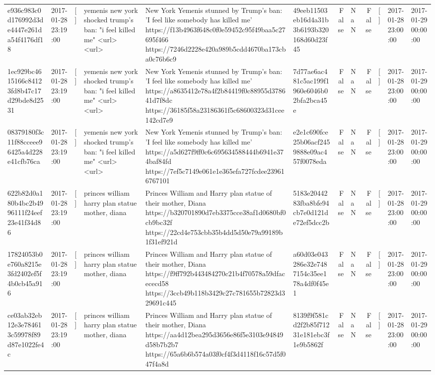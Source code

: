 \begin{tabular}{llllllrlrlll}
e936c983c0d176992d3de4447e261da54f4176df18 & 2017-01-28 23:19:00 & [] & yemenis new york shocked trump's ban: "i feel killed me" <url> <url> & New York Yemenis stunned by Trump's ban: 'I feel like somebody has killed me' https://f13b4963f648c0f0e59452c95f49baa5c27695f466 https://7246d2228e420a989b5cdd4670ba173cba0c76b6c9 & 49eeb11503eb16d4a31b3b6193b320168d60d23f45 & False & NaN & False & [] & 2017-01-28 23:00:00 & 2017-01-29 00:00:00 \\
1ec929bc4615166c84123fd8b47c17d29bde8d2531 & 2017-01-28 23:19:00 & [] & yemenis new york shocked trump's ban: "i feel killed me" <url> <url> & New York Yemenis stunned by Trump's ban: 'I feel like somebody has killed me' https://a8635412e78a4f2b84419f0c88955d378641d7f8dc https://36185f58a23186361f5c68600323d31cee142cd7e9 & 7d77ae6ac481c5ac199f1960e6046b02bfa2bca45e & False & NaN & False & [] & 2017-01-28 23:00:00 & 2017-01-29 00:00:00 \\
08379180f3c11f88cceee96425a4d228e41cfb76ca & 2017-01-28 23:19:00 & [] & yemenis new york shocked trump's ban: "i feel killed me" <url> <url> & New York Yemenis stunned by Trump's ban: 'I feel like somebody has killed me' https://a5d627f9ff0c6c695634588444b6941e374baf84fd https://7ef5c7149e061e1e365efa727fcdee239616767101 & e2e1c690fce25b06acf2459888e09ac457f0078eda & False & NaN & False & [] & 2017-01-28 23:00:00 & 2017-01-29 00:00:00 \\
622b82d0a180b4bc2b4996111f24eef23e41f34d86 & 2017-01-28 23:19:00 & [] & princes william harry plan statue mother, diana & Princes William and Harry plan statue of their mother, Diana https://b320701890d7eb3375cce38af1d0680bf0cb9bc32f https://22cd4e753cbb35b4dd5d50e79a99189b1f31ef921d & 5183e2044283fba8bfe94cb7e0d121de72ef5dcc2b & False & NaN & False & [] & 2017-01-28 23:00:00 & 2017-01-29 00:00:00 \\
17824053b0e760a8215e3fd2402ef5f4b0cb45a916 & 2017-01-28 23:19:00 & [] & princes william harry plan statue mother, diana & Princes William and Harry plan statue of their mother, Diana https://f9ff792b443484270c21b4f70578a59dfacececd58 https://3ccb49b118b3429c27c781655b72823d329691c445 & a60d03e043286e32e7487154c35ee178a4df0f45e1 & False & NaN & False & [] & 2017-01-28 23:00:00 & 2017-01-29 00:00:00 \\
ce03ab32eb12e3e784613c59978f89d87e1022fe4c & 2017-01-28 23:19:00 & [] & princes william harry plan statue mother, diana & Princes William and Harry plan statue of their mother, Diana https://aa4d12bea295d3656e86f5e3103e94849d58b7b2b7 https://65a6b6b574a03f0cf4f3d4118f16c57d5f047f4a8d & 8139f9f581cd2f2b85f71231e181ebc3f1e9b5862f & False & NaN & False & [] & 2017-01-28 23:00:00 & 2017-01-29 00:00:00 \\

\end{tabular}
